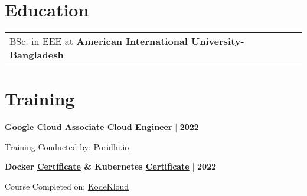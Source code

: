 \documentclass {article}
\begin{document}
\section{Education}
\begin{tabularx}{\linewidth}{@{}l X@{}}	
BSc. in EEE at \textbf{American International University-Bangladesh} \hfill \normalsize \\
\end{tabularx}

\section{Training}

    \begin{minipage}[t]{0.7\textwidth}
        \large \textbf{Google Cloud Associate Cloud Engineer} | \textbf{2022}
    \end{minipage}

    \begin{minipage}[t]{0.5\textwidth}
         Training Conducted by: \href{https://poridhi.io/}{Poridhi.io} 
    \end{minipage}

    \begin{minipage}[t]{0.7\textwidth}
         \large \textbf{Docker \href{https://kodekloud.com/certificate-verification/73614B2C60-735B546104-735B181BB8/}{Certificate} \& Kubernetes \href{https://kodekloud.com/certificate-verification/73614B2C60-735B5486E3-735B181BB8/}{Certificate}} | \textbf{2022}
    \end{minipage}

    \begin{minipage}[t]{0.5\textwidth}
         Course Completed on: \href{https://kodekloud.com/}{KodeKloud}
    \end{minipage}    
    
\end{document}

